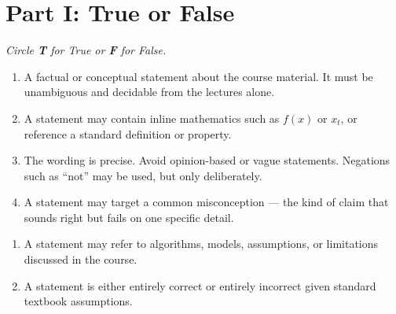 %
%

\section*{Part I: True or False}
\textit{Circle \textbf{T} for True or \textbf{F} for False.}

\vspace{0.4cm}

\begin{enumerate}[label=\textbf{1.\arabic*}, left=0pt, itemsep=0.35cm]

\item \tf
A factual or conceptual statement about the course material.
It must be unambiguous and decidable from the lectures alone.



\item \tf
A statement may contain inline mathematics such as $f(x)$ or $x_t$,
or reference a standard definition or property.



\item \tf
The wording is precise. Avoid opinion-based or vague statements.
Negations such as ``not'' may be used, but only deliberately.



\item \tf
A statement may target a common misconception --- the kind of claim
that sounds right but fails on one specific detail.



\end{enumerate}

\begin{enumerate}[label=\textbf{1.\arabic*}, left=0pt, itemsep=0.35cm, start=5]

\item \tf
A statement may refer to algorithms, models, assumptions, or limitations
discussed in the course.



\item \tf
A statement is either entirely correct or entirely incorrect
given standard textbook assumptions.



\end{enumerate}
